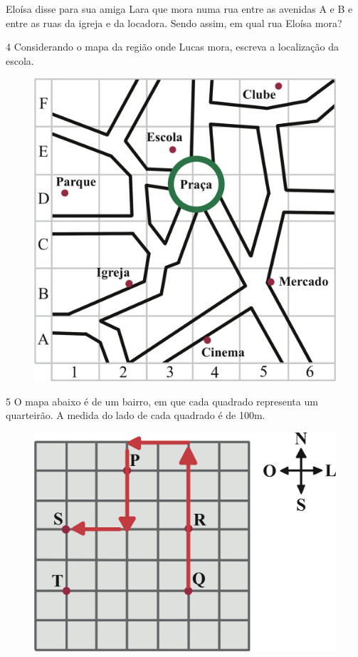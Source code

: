 Eloísa disse para sua amiga Lara que mora numa rua entre as avenidas A e
B e entre as ruas da igreja e da locadora. Sendo assim, em qual rua Eloísa
mora?


\num{4} Considerando o mapa da região onde Lucas mora, escreva a localização
da escola.

\begin{figure}[htpb!]
\centering
\includegraphics[width=\textwidth]{./ilustras-mat/modulo_12-atividade_4.png}
\end{figure}


\pagebreak
\num{5} O mapa abaixo é de um bairro, em que cada quadrado representa um
quarteirão. A medida do lado de cada quadrado é de 100m.

\begin{figure}[htpb!]
\centering
\includegraphics[width=.8\textwidth]{./ilustras-mat/modulo_12-atividade_5_resposta.png}
\end{figure}


